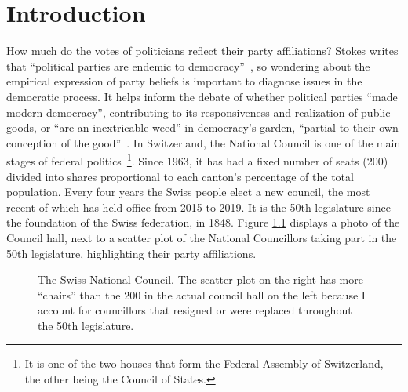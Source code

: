 \chapter{Introduction}\label{ch:intro}


How much do the votes of politicians reflect their party affiliations? Stokes writes that ``political parties are endemic to democracy''~\cite[p.245]{stokes1999}, so wondering about the empirical expression of party beliefs is important to diagnose issues in the democratic process. It helps inform the debate of whether political parties ``made modern democracy'', contributing to its responsiveness and realization of public goods, or ``are an inextricable weed'' in democracy's garden, ``partial to their own conception of the good''~\cite[pp.263--264]{stokes1999}. In Switzerland, the National Council is one of the main stages of federal politics~\footnote{It is one of the two houses that form the Federal Assembly of Switzerland, the other being the Council of States.}. Since 1963, it has had a fixed number of seats (200) divided into shares proportional to each canton's percentage of the total population. Every four years the Swiss people elect a new council, the most recent of which has held office from 2015 to 2019. It is the 50th legislature since the foundation of the Swiss federation, in 1848. Figure \ref{fig:snc_photo_and_parties} displays a photo of the Council hall, next to a scatter plot of the National Councillors taking part in the 50th legislature, highlighting their party affiliations.
\begin{figure}[H]
    \centering
    \hfill
    \caption[The Swiss National Council]{The Swiss National Council. The scatter plot on the right has more ``chairs'' than the 200 in the actual council hall on the left because I account for councillors that resigned or were replaced throughout the 50th legislature.}
    \label{fig:snc_photo_and_parties}
\end{figure}

